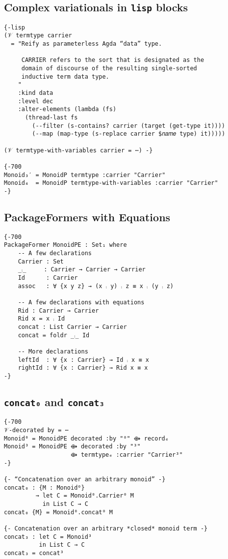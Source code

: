 \documentclass[sigplan,screen]{acmart}
\begin{document}
\subsection{Complex variationals in \texttt{lisp} blocks}
\label{sec:org2da2fbe}
\begin{small}
\begin{verbatim}
{-lisp
(𝒱 termtype carrier
  = "Reify as parameterless Agda “data” type.

     CARRIER refers to the sort that is designated as the
     domain of discourse of the resulting single-sorted
     inductive term data type.
    "
    :kind data
    :level dec
    :alter-elements (lambda (fs)
      (thread-last fs
        (--filter (s-contains? carrier (target (get-type it))))
        (--map (map-type (s-replace carrier $𝑛𝑎𝑚𝑒 type) it)))))

(𝒱 termtype-with-variables carrier = ⋯) -}

{-700
Monoid₃′ = MonoidP termtype :carrier "Carrier"
Monoid₄  = MonoidP termtype-with-variables :carrier "Carrier"
-}
\end{verbatim}
\end{small}

\subsection{PackageFormers with Equations}
\label{sec:orga79b4f3}
\begin{verbatim}
{-700
PackageFormer MonoidPE : Set₁ where
    -- A few declarations
    Carrier : Set
    _⨾_     : Carrier → Carrier → Carrier
    Id      : Carrier
    assoc   : ∀ {x y z} → (x ⨾ y) ⨾ z ≡ x ⨾ (y ⨾ z)

    -- A few declarations with equations
    Rid : Carrier → Carrier
    Rid x = x ⨾ Id
    concat : List Carrier → Carrier
    concat = foldr _⨾_ Id

    -- More declarations
    leftId  : ∀ {x : Carrier} → Id ⨾ x ≡ x
    rightId : ∀ {x : Carrier} → Rid x ≡ x
-}
\end{verbatim}

\subsection{\texttt{concat₀} and \texttt{concat₃}}
\label{sec:org5fef362}
\begin{verbatim}
{-700
𝒱-decorated by = ⋯
Monoid⁰ = MonoidPE decorated :by "⁰" ⟴ recordₑ
Monoid³ = MonoidPE ⟴ decorated :by "³"
                   ⟴ termtypeₑ :carrier "Carrier³"
-}

{- “Concatenation over an arbitrary monoid” -}
concat₀ : {M : Monoid⁰}
         → let C = Monoid⁰.Carrier⁰ M
           in List C → C
concat₀ {M} = Monoid⁰.concat⁰ M

{- Concatenation over an arbitrary *closed* monoid term -}
concat₃ : let C = Monoid³
          in List C → C
concat₃ = concat³
\end{verbatim}
\end{document}
